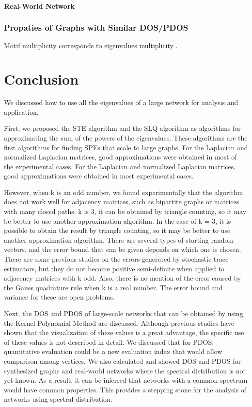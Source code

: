 \documentclass[senior,final,11pt]{iscs-thesis}
\begin{document}
\subsubsection{Real-World Network}

\subsection{Propaties of Graphs with Similar DOS/PDOS}
Motif multiplicity corresponds to eigenvalues multiplicity \cite{mehatari2015effect,dong2019network}.


\chapter{Conclusion}
We discussed how to use all the eigenvalues of a large network for analysis and application.

First, we proposed the STE algorithm and the SLQ algorithm as algorithms for approximating the sum of the powers of the eigenvalues. These algorithms are the first algorithms for finding SPEs that scale to large graphs. For the Laplacian and normalized Laplacian matrices, good approximations were obtained in most of the experimental cases. For the Laplacian and normalized Laplacian matrices, good approximations were obtained in most experimental cases.

However, when k is an odd number, we found experimentally that the algorithm does not work well for adjacency matrices, such as bipartite graphs or matrices with many closed paths. k is 3, it can be obtained by triangle counting, so it may be better to use another approximation algorithm. In the case of k = 3, it is possible to obtain the result by triangle counting, so it may be better to use another approximation algorithm. There are several types of starting random vectors, and the error bound that can be given depends on which one is chosen. There are some previous studies on the errors generated by stochastic trace estimators, but they do not become positive semi-definite when applied to adjacency matrices with k odd. Also, there is no mention of the error caused by the Gauss quadrature rule when k is a real number. The error bound and variance for these are open problems.


Next, the DOS and PDOS of large-scale networks that can be obtained by using the Kernel Polynomial Method are discussed. Although previous studies have shown that the visualization of these values is a great advantage, the specific use of these values is not described in detail. We discussed that for PDOS, quantitative evaluation could be a new evaluation index that would allow comparison among vertices. We also calculated and showed DOS and PDOS for synthesized graphs and real-world networks where the spectral distribution is not yet known. As a result, it can be inferred that networks with a common spectrum would have common properties. This provides a stepping stone for the analysis of networks using spectral distribution.
\end{document}
